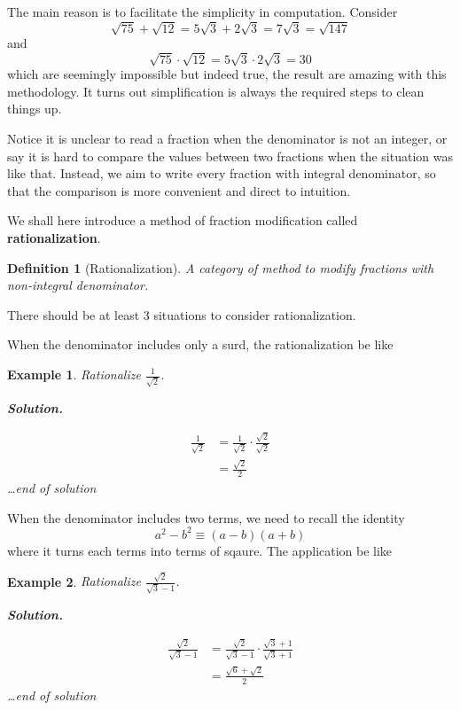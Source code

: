 \documentclass[12pt]{article}
\newtheorem{definition}{Definition}[section]
\newtheorem*{example}{Example}
\newenvironment{solution}{\textbf{Solution.} \par}{\hfill \textit{\dots end of solution}}
\begin{document}
    The main reason is to facilitate the simplicity in computation. Consider \[\sqrt{75}+\sqrt{12}=5\sqrt{3}+2\sqrt{3}=7\sqrt{3}=\sqrt{147}\] and \[\sqrt{75}\cdot \sqrt{12}=5\sqrt{3}\cdot 2\sqrt{3}=30\] which are seemingly impossible but indeed true, the result are amazing with this methodology. It turns out simplification is always the required steps to clean things up.

    Notice it is unclear to read a fraction when the denominator is not an integer, or say it is hard to compare the values between two fractions when the situation was like that. Instead, we aim to write every fraction with integral denominator, so that the comparison is more convenient and direct to intuition.

    We shall here introduce a method of fraction modification called \textbf{rationalization}.

    \begin{definition}[Rationalization]
        A category of method to modify fractions with non-integral denominator.
    \end{definition}

    There should be at least 3 situations to consider rationalization.

    When the denominator includes only a surd, the rationalization be like

    \begin{example}
        Rationalize $\frac{1}{\sqrt{2}}$.

        \begin{solution}
            \begin{align*}
                \frac{1}{\sqrt{2}}&=\frac{1}{\sqrt{2}}\cdot \frac{\sqrt{2}}{\sqrt{2}}\\
                &=\frac{\sqrt{2}}{2}
            \end{align*}
        \end{solution}
    \end{example}

    When the denominator includes two terms, we need to recall the identity \[a^2-b^2\equiv (a-b)(a+b)\] where it turns each terms into terms of sqaure. The application be like

    \begin{example}
        Rationalize $\frac{\sqrt{2}}{\sqrt{3}-1}$.

        \begin{solution}
            \begin{align*}
                \frac{\sqrt{2}}{\sqrt{3}-1}&=\frac{\sqrt{2}}{\sqrt{3}-1}\cdot \frac{\sqrt{3}+1}{\sqrt{3}+1}\\
                &=\frac{\sqrt{6}+\sqrt{2}}{2}
            \end{align*}
        \end{solution}
    \end{example}
\end{document}
